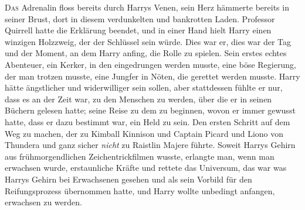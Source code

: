 
\lettrine{D}{as} Adrenalin floss bereits durch Harrys Venen, sein Herz hämmerte bereits in seiner Brust, dort in diesem verdunkelten und bankrotten Laden. Professor Quirrell hatte die Erklärung beendet, und in einer Hand hielt Harry einen winzigen Holzzweig, der der Schlüssel sein würde. Dies war er, dies war der Tag und der Moment, an dem Harry anfing, die Rolle zu spielen. Sein erstes echtes Abenteuer, ein Kerker, in den eingedrungen werden musste, eine böse Regierung, der man trotzen musste, eine Jungfer in Nöten, die gerettet werden musste. Harry hätte ängstlicher und widerwilliger sein sollen, aber stattdessen fühlte er nur, dass es an der Zeit war, zu den Menschen zu werden, über die er in seinen Büchern gelesen hatte; seine Reise zu dem zu beginnen, wovon er immer gewusst hatte, dass er dazu bestimmt war, ein Held zu sein. Den ersten Schritt auf dem Weg zu machen, der zu Kimball Kinnison und Captain Picard und Liono von Thundera und ganz sicher \emph{nicht} zu Raistlin Majere führte. Soweit Harrys Gehirn aus frühmorgendlichen Zeichentrickfilmen wusste, erlangte man, wenn man erwachsen wurde, erstaunliche Kräfte und rettete das Universum, das war was Harrys Gehirn bei Erwachsenen gesehen und als sein Vorbild für den Reifungsprozess übernommen hatte, und Harry wollte unbedingt anfangen, erwachsen zu werden.

